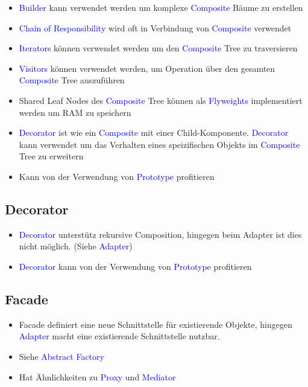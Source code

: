 \begin{itemize}
    \item \textcolor{blue}{Builder} kann verwendet werden um komplexe \textcolor{blue}{Composite} Bäume zu erstellen
    \item \textcolor{blue}{Chain of Responsibility} wird oft in Verbindung von \textcolor{blue}{Composite} verwendet
    \item \textcolor{blue}{Iterators} können verwendet werden um den \textcolor{blue}{Composite} Tree zu traversieren
    \item \textcolor{blue}{Visitors} können verwendet werden, um Operation über den gesamten \textcolor{blue}{Composite} Tree auszuführen
    \item Shared Leaf Nodes des \textcolor{blue}{Composite} Tree können als \textcolor{blue}{Flyweights} implementiert werden um RAM zu speichern
    \item \textcolor{blue}{Decorator} ist wie ein \textcolor{blue}{Composite} mit einer Child-Komponente. \textcolor{blue}{Decorator} kann verwendet um das Verhalten eines speizifischen Objekts im \textcolor{blue}{Composite} Tree zu erweitern
    \item Kann von der Verwendung von \textcolor{blue}{Prototype} profitieren
\end{itemize}

\subsection{Decorator}

\begin{itemize}
    \item \textcolor{blue}{Decorator} unterstütz rekursive Composition, hingegen beim Adapter ist dies nicht möglich. (Siehe \textcolor{blue}{Adapter})
    \item \textcolor{blue}{Decorator} kann von der Verwendung von \textcolor{blue}{Prototype} profitieren
\end{itemize}

\subsection{Facade}

\begin{itemize}
    \item Facade definiert eine neue Schnittstelle für existierende Objekte, hingegen \textcolor{blue}{Adapter} macht eine existierende Schnittstelle nutzbar.
    \item Siehe \textcolor{blue}{Abstract Factory}
    \item Hat Ähnlichkeiten zu \textcolor{blue}{Proxy} und \textcolor{blue}{Mediator}
\end{itemize}

